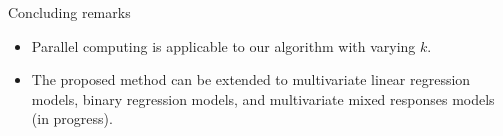 \documentclass[citecolor=blue,10pt]{beamer}
\newcommand{\0} {\mbox{\boldmath$0$}}
\begin{document}
\begin{frame}{Concluding remarks}
\begin{itemize}\itemsep=4mm
\item Parallel computing is applicable to our algorithm with varying $k$. 
\item The proposed method can be extended to multivariate linear regression models, binary regression models, and multivariate mixed responses models (in progress).
\end{itemize}

\end{frame}

\begin{frame}\footnotesize
%
%
\begin{thebibliography}{}












\end{thebibliography}
\end{frame}
\end{document}
